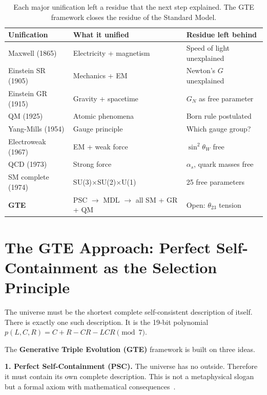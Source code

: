 \documentclass[11pt,a4paper]{article}
\newcommand{\term}[1]{\textbf{#1}}
\begin{document}
\begin{table}[h]
\centering
\caption{Each major unification left a residue that the next step explained.
The GTE framework closes the residue of the Standard Model.}
\label{tab:residue}
\small
\begin{tabular}{lll}
\toprule
\textbf{Unification} & \textbf{What it unified} & \textbf{Residue left behind} \\
\midrule
Maxwell (1865) & Electricity + magnetism & Speed of light unexplained \\
Einstein SR (1905) & Mechanics + EM & Newton's $G$ unexplained \\
Einstein GR (1915) & Gravity + spacetime & $G_N$ as free parameter \\
QM (1925) & Atomic phenomena & Born rule postulated \\
Yang-Mills (1954) & Gauge principle & Which gauge group? \\
Electroweak (1967) & EM + weak force & $\sin^2\theta_W$ free \\
QCD (1973) & Strong force & $\alpha_s$, quark masses free \\
SM complete (1974) & SU(3)$\times$SU(2)$\times$U(1) & 25 free parameters \\
\textbf{GTE} & PSC $\to$ MDL $\to$ all SM + GR + QM & Open: $\theta_{23}$ tension \\
\bottomrule
\end{tabular}
\end{table}

\section{The GTE Approach: Perfect Self-Containment as the Selection Principle}
\label{sec:gte}

\begin{tcolorbox}[colback=boxblue,colframe=blue!40!black,
  title=The selection principle in one sentence]
The universe must be the shortest complete self-consistent description of itself.
There is exactly one such description.
It is the 19-bit polynomial $p(L,C,R) = C + R - CR - LCR \pmod{7}$.
\end{tcolorbox}

The \term{Generative Triple Evolution (GTE)} framework is built on three ideas.

\textbf{1. Perfect Self-Containment (PSC).}
The universe has no outside.
Therefore it must contain its own complete description.
This is not a metaphysical slogan but a formal axiom with mathematical
consequences~\cite{SpivackGTECompleteFramework}.
\end{document}
